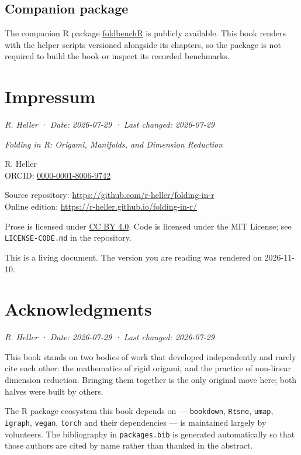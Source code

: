 \documentclass[
  british,
  a4paper,
]{book}
\begin{document}
\section*{Companion package}\label{companion-package}

The companion R package \href{https://github.com/r-heller/foldbenchR}{foldbenchR} is publicly available. This book renders with the helper scripts versioned alongside its chapters, so the package is not required to build the book or inspect its recorded benchmarks.

\chapter*{Impressum}\label{impressum}

\emph{R. Heller · Date: 2026-07-29 · Last changed: 2026-07-29}

\emph{Folding in R: Origami, Manifolds, and Dimension Reduction}

R. Heller\\
ORCID: \href{https://orcid.org/0000-0001-8006-9742}{0000-0001-8006-9742}

Source repository: \url{https://github.com/r-heller/folding-in-r}\\
Online edition: \url{https://r-heller.github.io/folding-in-r/}

Prose is licensed under \href{https://creativecommons.org/licenses/by/4.0/}{CC BY 4.0}.
Code is licensed under the MIT License; see \texttt{LICENSE-CODE.md} in the repository.

This is a living document. The version you are reading was rendered on
2026-11-10.

\chapter*{Acknowledgments}\label{acknowledgments}

\emph{R. Heller · Date: 2026-07-29 · Last changed: 2026-07-29}

This book stands on two bodies of work that developed independently and rarely
cite each other: the mathematics of rigid origami, and the practice of
non-linear dimension reduction. Bringing them together is the only original
move here; both halves were built by others.

The R package ecosystem this book depends on --- \texttt{bookdown}, \texttt{Rtsne}, \texttt{umap},
\texttt{igraph}, \texttt{vegan}, \texttt{torch} and their dependencies --- is maintained largely by
volunteers. The bibliography in \texttt{packages.bib} is generated automatically so
that those authors are cited by name rather than thanked in the abstract.
\end{document}
